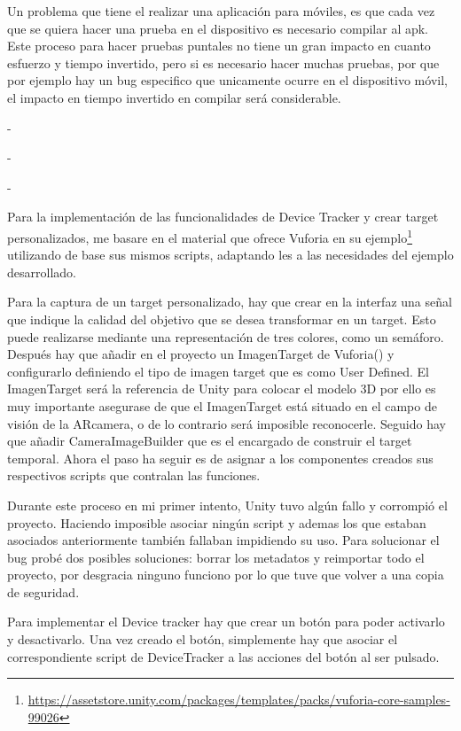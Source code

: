 Un problema que tiene el realizar una aplicación para móviles, es que cada vez que se quiera hacer una prueba en el dispositivo es necesario compilar al apk. Este proceso para hacer pruebas puntales no tiene un gran impacto en cuanto esfuerzo y tiempo invertido, pero si es necesario hacer muchas pruebas, por que por ejemplo hay un bug especifico que unicamente ocurre en el dispositivo móvil, el impacto en tiempo invertido en compilar será considerable.


-

-

-

Para la implementación de las funcionalidades de Device Tracker y crear target personalizados, me basare en el material que ofrece Vuforia en su ejemplo\footnote{\url{https://assetstore.unity.com/packages/templates/packs/vuforia-core-samples-99026}} utilizando de base sus mismos scripts, adaptando les a las necesidades del ejemplo desarrollado.

Para la captura de un target personalizado, hay que crear en la interfaz una señal que indique la calidad del objetivo que se desea transformar en un target.
Esto puede realizarse mediante una representación de tres colores, como un semáforo.
Después hay que añadir en el proyecto un ImagenTarget de Vuforia() y configurarlo definiendo el tipo de imagen target que es como User Defined. El ImagenTarget será la referencia de Unity para colocar el modelo 3D por ello es muy importante asegurase de que el ImagenTarget está situado en el campo de visión de la ARcamera, o de lo contrario será imposible reconocerle. 
Seguido hay que añadir CameraImageBuilder que es el encargado de construir el target temporal. 
Ahora el paso ha seguir es de asignar a los componentes creados sus respectivos scripts que contralan las funciones. 

Durante este proceso en mi primer intento, Unity tuvo algún fallo y corrompió el proyecto. Haciendo imposible asociar ningún script y ademas los que estaban asociados anteriormente también fallaban impidiendo su uso. Para solucionar el bug probé dos posibles soluciones: borrar los metadatos y reimportar todo el proyecto, por desgracia ninguno funciono por lo que tuve que volver a una copia de seguridad.


Para implementar el Device tracker hay que crear un botón para poder activarlo y desactivarlo. Una vez creado el botón, simplemente hay que asociar el correspondiente script de DeviceTracker a las acciones del botón al ser pulsado.



